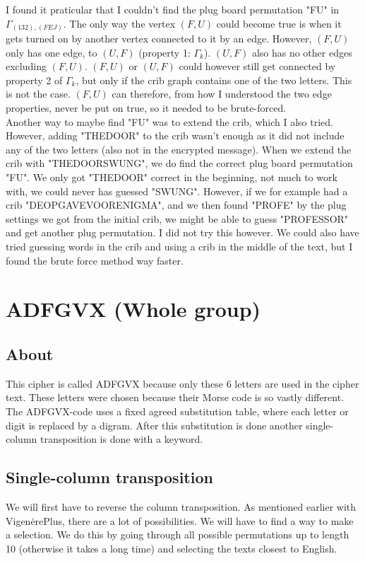\documentclass{article}
\begin{document}
I found it praticular that I couldn't find the plug board permutation "FU" in $\Gamma_{(132),(FEJ)}$. The only way the vertex $(F,U)$ could become true is when it gets turned on by another vertex connected to it by an edge. However, $(F,U)$ only has one edge, to $(U,F)$ (property 1: $\Gamma_k$). $(U,F)$ also has no other edges excluding $(F,U)$. $(F,U)$ or $(U,F)$ could however still get connected by property 2 of $\Gamma_k$, but only if the crib graph contains one of the two letters. This is not the case. $(F,U)$ can therefore, from how I understood the two edge properties, never be put on true, so it needed to be brute-forced.\\

Another way to maybe find "FU" was to extend the crib, which I also tried. However, adding "THEDOOR" to the crib wasn't enough as it did not include any of the two letters (also not in the encrypted message). When we extend the crib with "THEDOORSWUNG", we do find the correct plug board permutation "FU". We only got "THEDOOR" correct in the beginning, not much to work with, we could never has guessed "SWUNG". However, if we for example had a crib "DEOPGAVEVOORENIGMA", and we then found "PROFE" by the plug settings we got from the initial crib, we might be able to guess "PROFESSOR" and get another plug permutation. I did not try this however. We could also have tried guessing words in the crib and using a crib in the middle of the text, but I found the brute force method way faster.\\

\newpage

\section{ADFGVX (Whole group)}
\subsection{About}
This cipher is called ADFGVX because only these 6 letters are used in the cipher text. These letters were chosen because their Morse code is so vastly different. The ADFGVX-code uses a fixed agreed substitution table, where each letter or digit is replaced by a digram.  After this substitution is done another single-column transposition is done with a keyword.
\subsection{Single-column transposition}
We will first have to reverse the column transposition. As mentioned earlier with VigenėrePlus, there are a lot of possibilities. We will have to find a way to make a selection. We do this by going through all possible permutations up to length 10 (otherwise it takes a long time) and selecting the texts closest to English.\\
\end{document}
